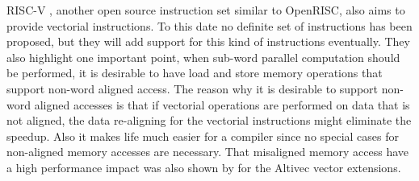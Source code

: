 RISC-V \cite{RISCV}, another open source instruction set similar to OpenRISC,
also aims to provide vectorial instructions. To this date no definite set of
instructions has been proposed, but they will add support for this kind of
instructions eventually. They also highlight one important point, when sub-word
parallel computation should be performed, it is desirable to have load and
store memory operations that support non-word aligned access.
The reason why it is desirable to support non-word aligned accesses is that if
vectorial operations are performed on data that is not aligned, the data
re-aligning for the vectorial instructions might eliminate the speedup. Also it
makes life much easier for a compiler since no special cases for non-aligned
memory accesses are necessary.
That misaligned memory access have a high performance impact was also shown by
\cite{UNALIGN} for the Altivec vector extensions.

